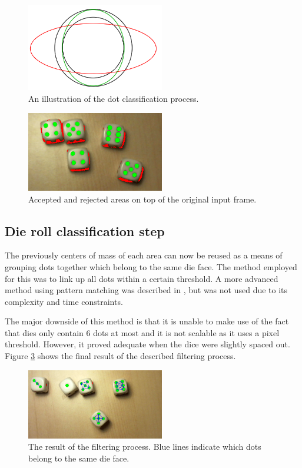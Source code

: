 \begin{figure}
	\centering
	\includegraphics[width=60mm]{images/dies/minmax.png}
	\caption{An illustration of the dot classification process.}
	\label{fig:minmax}
\end{figure}

\begin{figure}
	\centering
	\includegraphics[width=60mm]{images/dies/rejectedAreas2.png}
	\caption{Accepted and rejected areas on top of the original input frame.}
	\label{fig:acceptedRejected}
\end{figure}

\subsection{Die roll classification step}
The previously centers of mass of each area can now be reused as a means of grouping dots together which belong to the same die face. The method employed for this was to link up all dots within a certain threshold. A more advanced method using pattern matching was described in \cite{correia1995automated}, but was not used due to its complexity and time constraints. 

The major downside of this method is that it is unable to make use of the fact that dies only contain 6 dots at most and it is not scalable as it uses a pixel threshold. However, it proved adequate when the dice were slightly spaced out. Figure \ref{fig:filteringComplete} shows the final result of the described filtering process.

\begin{figure}
	\centering
	\includegraphics[width=60mm]{images/dies/rollRecognition.png}
	\caption{The result of the filtering process. Blue lines indicate which dots belong to the same die face.}
	\label{fig:filteringComplete}
\end{figure}

